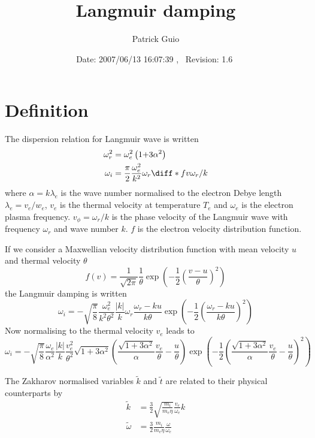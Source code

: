 \documentclass[10pt,a4paper]{article}
\title{Langmuir damping}
\author{Patrick Guio}
\date{\normalsize$ $Date: 2007/06/13 16:07:39 $ $,~ $ $Revision: 1.6 $ $}
\begin{document}
\maketitle

\section{Definition}
The dispersion relation for Langmuir wave is written
\begin{align*}
\omega_r^2&=\omega_e^2\left(1{+}3\alpha^2\right)\\
\omega_i&=\frac{\pi}{2}\frac{\omega_e^2}{k^2}\omega_r
\diff*{f}{v}{\omega_r/k}
\end{align*}
where $\alpha=k\lambda_e$ is the wave number normalised to the electron 
Debye length $\lambda_e=v_e/w_e$, $v_e$ is the thermal velocity at temperature
$T_e$ and $\omega_e$ is the electron plasma frequency.
$v_\phi=\omega_r/k$ is the phase velocity of the Langmuir wave with
frequency $\omega_r$ and wave number $k$. 
$f$ is the electron velocity
distribution function.

If we consider a Maxwellian velocity distribution function with 
mean velocity $u$ and thermal velocity $\theta$
\begin{equation}
f(v)=\frac{1}{\sqrt{2\pi}}\frac{1}{\theta}
\exp\left(-\frac{1}{2}\left(\frac{v-u}{\theta}\right)^2\right)
\end{equation}
the Langmuir damping is written
\begin{equation}
\omega_i=-\sqrt{\frac{\pi}{8}}\frac{\omega_e^2}{k^2\theta^2}\frac{|k|}{k}
\omega_r\frac{\omega_r-ku}{k\theta}
\exp\left(-\frac{1}{2}\left(\frac{\omega_r-ku}{k\theta}\right)^2\right)
\end{equation}
Now normalising to the thermal velocity $v_e$ leads to
\begin{equation}
\omega_i=-\sqrt{\frac{\pi}{8}}\frac{\omega_e}{\alpha^2}\frac{|k|}{k}
\frac{v_e^2}{\theta^2}\sqrt{1{+}3\alpha^2}
\left(
\frac{\sqrt{1{+}3\alpha^2}}{\alpha}\frac{v_e}{\theta}-\frac{u}{\theta}
\right)
\exp\left(-\frac{1}{2}\left(
\frac{\sqrt{1{+}3\alpha^2}}{\alpha}\frac{v_e}{\theta}-\frac{u}{\theta}
\right)^2\right)
\end{equation}


The Zakharov normalised variables  $\tilde{k}$ and $\tilde{t}$ are related to
their physical counterparts by
\begin{align*}
\tilde{k}&=\frac{3}{2}\sqrt{\frac{m_i}{m_e\eta}}\frac{v_e}{\omega_e}k\\
\tilde{\omega}&=\frac{3}{2}\frac{m_i}{m_e\eta}\frac{\omega}{\omega_e}
\end{align*}
\end{document}
